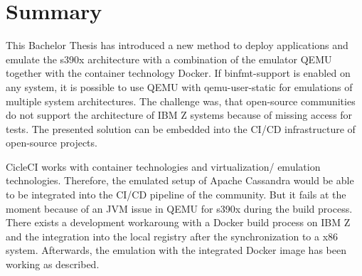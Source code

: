 \chapter{Summary}\label{ch:summary}

This Bachelor Thesis has introduced a new method to deploy applications and emulate the s390x architecture with a combination of the emulator QEMU together with the container technology Docker.
If binfmt-support is enabled on any system, it is possible to use QEMU with qemu-user-static for emulations of multiple system architectures. 
The challenge was, that open-source communities do not support the architecture of IBM Z systems because of missing access for tests. The presented solution can be embedded into the CI/CD infrastructure of open-source projects. 

CicleCI works with container technologies and virtualization/ emulation technologies. 
Therefore, the emulated setup of Apache Cassandra would be able to be integrated into the CI/CD pipeline of the community. But it fails at the moment because of an JVM issue in QEMU for s390x during the build process. 
There exists a development workaroung with a Docker build process on IBM Z and the integration into the local registry after the synchronization to a x86 system. Afterwards, the emulation with the integrated Docker image has been working as described.
